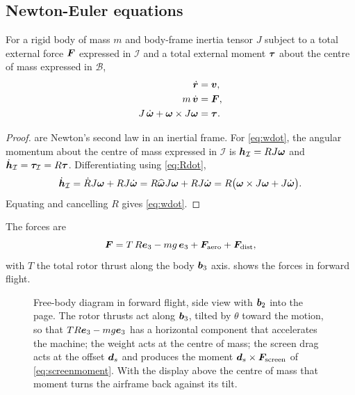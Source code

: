 \subsection{Newton-Euler equations}

\begin{theorem}
\label{thm:newtoneuler}
For a rigid body of mass $m$ and body-frame inertia tensor $J$ subject to a
total external force $\bm{F}$ expressed in $\mathcal I$ and a total external
moment $\bm{\tau}$ about the centre of mass expressed in $\mathcal B$,
\begin{align}
  \dot{\bm{r}} &= \bm{v}, \label{eq:rdot}\\
  m\,\dot{\bm{v}} &= \bm{F}, \label{eq:vdot}\\
  J\,\dot{\bm{\omega}} + \bm{\omega}\times J\bm{\omega}
    &= \bm{\tau} . \label{eq:wdot}
\end{align}
\end{theorem}

\begin{proof}
 are Newton's second law in an inertial frame. For
\cref{eq:wdot}, the angular momentum about the centre of mass expressed in
$\mathcal I$ is $\bm{h}_{\mathcal I} = RJ\bm{\omega}$ and
$\dot{\bm{h}}_{\mathcal I} = \bm{\tau}_{\mathcal I} = R\bm{\tau}$.
Differentiating using \cref{eq:Rdot},
\[
  \dot{\bm{h}}_{\mathcal I}
  = \dot{R} J\bm{\omega} + RJ\dot{\bm{\omega}}
  = R\widehat{\bm{\omega}}J\bm{\omega} + RJ\dot{\bm{\omega}}
  = R\big(\bm{\omega}\times J\bm{\omega} + J\dot{\bm{\omega}}\big).
\]
Equating and cancelling $R$ gives \cref{eq:wdot}.
\end{proof}

The forces are
\begin{equation}
  \bm{F} = T\,R\bm{e}_3 - mg\,\bm{e}_3 + \bm{F}_{\mathrm{aero}}
             + \bm{F}_{\mathrm{dist}} ,
  \label{eq:forces}
\end{equation}
with $T$ the total rotor thrust along the body $\bm{b}_3$ axis.
 shows the forces in forward flight.

\begin{figure}[tbp]
\centering

\caption{Free-body diagram in forward flight, side view with $\bm{b}_2$ into
the page. The rotor thrusts act along $\bm{b}_3$, tilted by $\theta$ toward the
motion, so that $TR\bm{e}_3-mg\bm{e}_3$ has a horizontal component that
accelerates the machine; the weight acts at the centre of mass; the screen drag
acts at the offset $\bm{d}_s$ and produces the moment
$\bm{d}_s\times\bm{F}_{\mathrm{screen}}$ of \cref{eq:screenmoment}. With the
display above the centre of mass that moment turns the airframe back against
its tilt.}
\label{fig:fbd}
\end{figure}

